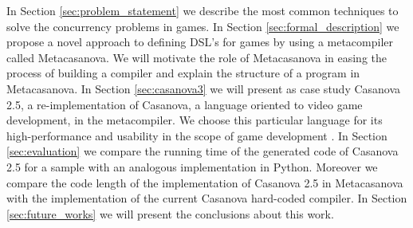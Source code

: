 In Section \ref{sec:problem_statement} we describe the most
common techniques to solve the concurrency problems in games. In
Section \ref{sec:formal_description} we propose a novel approach to
defining DSL's for games by using a metacompiler called Metacasanova.
We will motivate the role of Metacasanova in easing the process of building a compiler and explain the structure of a program in Metacasanova. In Section
\ref{sec:casanova3} we will present as case study Casanova 2.5, a
re-implementation of Casanova, a language oriented to video game
development, in the metacompiler. We choose this particular language
for its high-performance and usability in the scope of game
development \cite{CASANOVA2_PAPER}. In Section \ref{sec:evaluation} we
compare the running time of the generated code of Casanova 2.5 for a
sample with an analogous implementation in Python. Moreover we compare
the code length of the implementation of Casanova 2.5 in Metacasanova
with the implementation of the current Casanova hard-coded compiler.
In Section \ref{sec:future_works} we will present the conclusions about this work.

